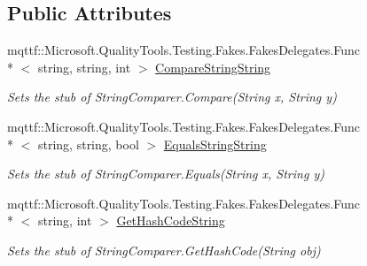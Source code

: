 \subsection*{Public Attributes}
\begin{DoxyCompactItemize}
\item 
mqttf\-::\-Microsoft.\-Quality\-Tools.\-Testing.\-Fakes.\-Fakes\-Delegates.\-Func\\*
$<$ string, string, int $>$ \hyperlink{class_system_1_1_fakes_1_1_stub_string_comparer_a21eefae71e2efbd864d08474a298cc63}{Compare\-String\-String}
\begin{DoxyCompactList}\small\item\em Sets the stub of String\-Comparer.\-Compare(\-String x, String y)\end{DoxyCompactList}\item 
mqttf\-::\-Microsoft.\-Quality\-Tools.\-Testing.\-Fakes.\-Fakes\-Delegates.\-Func\\*
$<$ string, string, bool $>$ \hyperlink{class_system_1_1_fakes_1_1_stub_string_comparer_a10e03286eff3cb4447141a16ca69e2c8}{Equals\-String\-String}
\begin{DoxyCompactList}\small\item\em Sets the stub of String\-Comparer.\-Equals(\-String x, String y)\end{DoxyCompactList}\item 
mqttf\-::\-Microsoft.\-Quality\-Tools.\-Testing.\-Fakes.\-Fakes\-Delegates.\-Func\\*
$<$ string, int $>$ \hyperlink{class_system_1_1_fakes_1_1_stub_string_comparer_a22f4101e8845d255afdacdb91f428827}{Get\-Hash\-Code\-String}
\begin{DoxyCompactList}\small\item\em Sets the stub of String\-Comparer.\-Get\-Hash\-Code(\-String obj)\end{DoxyCompactList}\end{DoxyCompactItemize}
